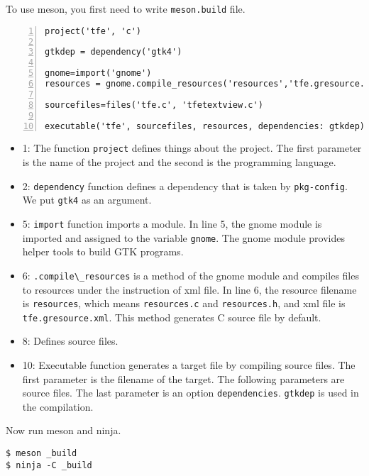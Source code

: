 To use meson, you first need to write
\passthrough{\lstinline!meson.build!} file.

\begin{lstlisting}[numbers=left]
project('tfe', 'c')

gtkdep = dependency('gtk4')

gnome=import('gnome')
resources = gnome.compile_resources('resources','tfe.gresource.xml')

sourcefiles=files('tfe.c', 'tfetextview.c')

executable('tfe', sourcefiles, resources, dependencies: gtkdep)
\end{lstlisting}

\begin{itemize}
\tightlist
\item
  1: The function \passthrough{\lstinline!project!} defines things about
  the project. The first parameter is the name of the project and the
  second is the programming language.
\item
  2: \passthrough{\lstinline!dependency!} function defines a dependency
  that is taken by \passthrough{\lstinline!pkg-config!}. We put
  \passthrough{\lstinline!gtk4!} as an argument.
\item
  5: \passthrough{\lstinline!import!} function imports a module. In line
  5, the gnome module is imported and assigned to the variable
  \passthrough{\lstinline!gnome!}. The gnome module provides helper
  tools to build GTK programs.
\item
  6: \passthrough{\lstinline!.compile\_resources!} is a method of the
  gnome module and compiles files to resources under the instruction of
  xml file. In line 6, the resource filename is
  \passthrough{\lstinline!resources!}, which means
  \passthrough{\lstinline!resources.c!} and
  \passthrough{\lstinline!resources.h!}, and xml file is
  \passthrough{\lstinline!tfe.gresource.xml!}. This method generates C
  source file by default.
\item
  8: Defines source files.
\item
  10: Executable function generates a target file by compiling source
  files. The first parameter is the filename of the target. The
  following parameters are source files. The last parameter is an option
  \passthrough{\lstinline!dependencies!}.
  \passthrough{\lstinline!gtkdep!} is used in the compilation.
\end{itemize}

Now run meson and ninja.

\begin{lstlisting}
$ meson _build
$ ninja -C _build
\end{lstlisting}

